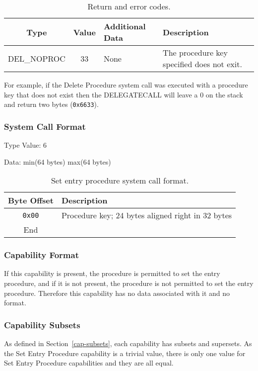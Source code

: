 \documentclass[english,a4paper]{article}
\let\oldparagraph\subsubsection
\renewcommand{\subsubsection}[1]{\oldparagraph{#1}\mbox{}}
\begin{document}
\begin{table}[H]
  \caption{Return and error codes.}
  \centering{}%
  \begin{tabularx}{\textwidth}{c|c|l|X}
    \hline
    Type & Value & Additional Data & Description \\
    \hline
    \hline
    DEL\_NOPROC  & 33 & None & The procedure key specified does not exit. \\
    \hline
  \end{tabularx}
\end{table}

For example, if the Delete
Procedure system call was executed with a procedure key that does not exist then
the DELEGATECALL will leave a 0 on the stack and return two bytes
(\texttt{0x6633}).

\subsubsection{System Call Format}

Type Value: 6

Data: min(64 bytes) max(64 bytes)

\begin{table}[H]
  \caption{Set entry procedure system call format.}
  \centering{}%
  \begin{tabularx}{\textwidth}{c|X}
    \hline
    Byte Offset & Description\\
    \hline
    \hline
    \texttt{0x00} & Procedure key; 24 bytes aligned right in 32 bytes\\
    \hline
    End &  \\
    \hline
  \end{tabularx}
\end{table}

\subsubsection{Capability Format}
If this capability is present, the procedure is permitted to set the entry
procedure, and if it is not present, the procedure is not permitted to set the
entry procedure. Therefore this capability has no data associated with it and no
format.

\subsubsection{Capability Subsets}
As defined in Section~\ref{cap-subsets}, each capability has subsets and
supersets. As the Set Entry Procedure capability is a trivial value, there is
only one value for Set Entry Procedure capabilities and they are all equal.
\end{document}
